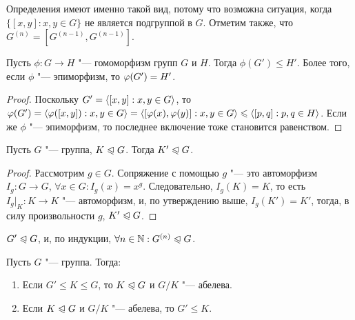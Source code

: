 \begin{note}
	Определения имеют именно такой вид, потому что возможна ситуация, когда $\{[x, y]: x, y \in G\}$ не является подгруппой в $G$. Отметим также, что $G^{(n)} = [G^{(n - 1)}, G^{(n - 1)}]$.
\end{note}

\begin{proposition}
	Пусть $\phi: G \to H$ "--- гомоморфизм групп $G$ и $H$. Тогда $\phi(G') \le H'$. Более того, если $\phi$ "--- эпиморфизм, то $\phi(G') \hm= H'$.
\end{proposition}

\begin{proof}
	Поскольку $G' = \langle[x, y]: x, y \in G\rangle$, то $\phi(G') \hm= \gl\phi([x, y]): x, y \in G\gr \hm= \gl[\phi(x), \phi(y)]: x, y \in G\gr \le \gl[p, q]: p, q \hm\in H\gr$. Если же $\phi$ "--- эпиморфизм, то последнее включение тоже становится равенством.
\end{proof}

\begin{corollary}
	Пусть $G$ "--- группа, $K \trianglelefteqslant G$. Тогда $K' \trianglelefteqslant G$.
\end{corollary}

\begin{proof}
	Рассмотрим $g \in G$. Сопряжение с помощью $g$ "--- это автоморфизм $I_g: G \to G$, $\forall x \in G: I_g(x) = x^g$. Следовательно, $I_g(K) = K$, то есть $I_g|_K : K \to K$ "--- автоморфизм, и, по утверждению выше, $I_g(K') = K'$, тогда, в силу произвольности $g$, $K' \trianglelefteqslant G$.
\end{proof}

\begin{corollary}
	$G' \trianglelefteqslant G$, и, по индукции, $\forall n \in \mathbb{N}: G^{(n)} \trianglelefteqslant G$.
\end{corollary}

\begin{theorem} Пусть $G$ "--- группа. Тогда:
	\begin{enumerate}
		\item Если $G' \le K \le G$, то $K \trianglelefteqslant G$ и $G / K$ "--- абелева.
		\item Если $K \trianglelefteqslant G$ и $G / K$ "--- абелева, то $G' \le K$.
	\end{enumerate}
\end{theorem}

